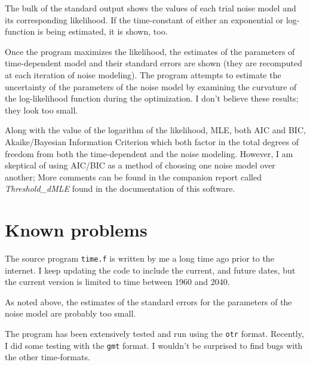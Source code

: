\documentclass[12pt]{amsart}
\begin{document}
The bulk of the standard output shows the values of each trial noise model and its corresponding likelihood. If
the time-constant of either an exponential or log-function is being estimated, it is shown, too.

Once the program maximizes the likelihood, the estimates of the parameters of time-dependent model 
and their standard errors are shown (they are recomputed at each iteration of noise modeling). 
The program attempts to estimate the uncertainty of the parameters of the noise model by
examining the curvature of the log-likelihood function during the optimization.  I don't believe these
results; they look too small.

Along with the value of the logarithm of the likelihood, MLE, both AIC and BIC, Akaike/Bayesian Information Criterion
which both factor in the total degrees of freedom from both the time-dependent and the noise modeling.  However,
I am skeptical of using  AIC/BIC as a method of choosing one noise model over another; More comments
can be found in the companion report called \textit{Threshold\_dMLE} found in the documentation of this software.

\section{Known problems}

The source program \texttt{time.f} is written by me a long time ago prior to the internet. I keep
updating the code to include the current, and future dates, but the current version is
limited to time between 1960 and 2040.

As noted above, the estimates of the standard errors for the parameters of the noise model are
probably too small.

The program has been extensively tested and run using the \texttt{otr} format. Recently, I did some
testing with the \texttt{gmt} format. I wouldn't be
surprised to find bugs with the other time-formats.
\end{document}
